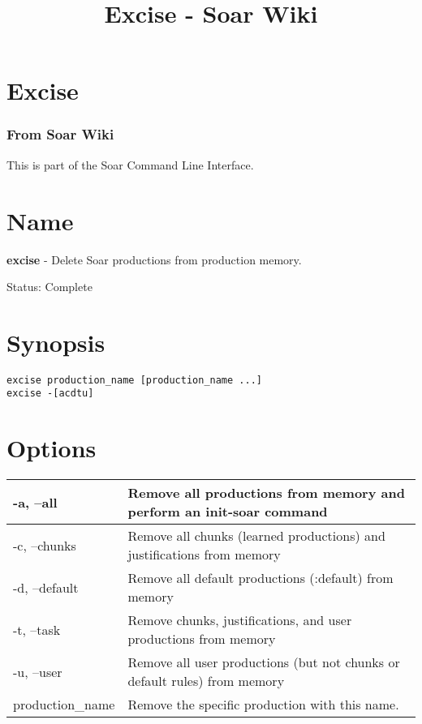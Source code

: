\documentclass[10pt]{article}
\title{Excise - Soar Wiki}
\begin{document}
\section*{Excise}
\subsubsection*{From Soar Wiki}


 This is part of the Soar Command Line Interface. 
\section*{ Name }


 \textbf{excise}
 - Delete Soar productions from production memory. 


 Status: Complete
\section*{ Synopsis }


  \begin{verbatim}
excise production_name [production_name ...]
excise -[acdtu]

\end{verbatim}



 
\section*{ Options }


\begin{tabular}{|p{1in}|p{5in}|}
\hline 
 -a, --all  & Remove all productions from memory and perform an init-soar command  \\
 \hline 
 -c, --chunks  & Remove all chunks (learned productions) and justifications from memory  \\
 \hline 
 -d, --default  & Remove all default productions (:default) from memory  \\
 \hline 
 -t, --task  & Remove chunks, justifications, and user productions from memory  \\
 \hline 
 -u, --user  & Remove all user productions (but not chunks or default rules) from memory  \\
 \hline 
production\_name & Remove the specific production with this name.  \\
 \hline 

\end{tabular}
\end{document}
